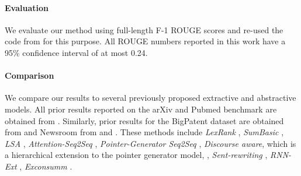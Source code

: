 \documentclass[letterpaper]{article} \usepackage{arXiv_V2_aaai_sty_mods}  \usepackage{times}  \usepackage{helvet} \usepackage{courier}  \usepackage[hyphens]{url}  \usepackage{graphicx} \usepackage[utf8]{inputenc} \usepackage[T1]{fontenc}    \usepackage{url}            \usepackage{booktabs}       \usepackage{amsfonts}       \usepackage{nicefrac}       \usepackage{multirow}
\begin{document}
\paragraph{Evaluation} We evaluate our method using full-length F-1 ROUGE scores \cite{rouge} and re-used the code from \cite{discourse/corr/abs-1804-05685} for this purpose. All ROUGE numbers reported in this work have a 95\% confidence interval of at most 0.24.

\paragraph{Comparison} We compare our results to several previously proposed extractive and abstractive models. All prior results reported on the arXiv and Pubmed benchmark are obtained from \cite{discourse/corr/abs-1804-05685}. Similarly, prior results for the BigPatent dataset are obtained from \cite{sharma2019bigpatent} and Newsroom from \cite{grusky2018newsroom} and \cite{mendes2019jointly}. These methods include \emph{LexRank} \cite{erkan2004lexrank}, \emph{SumBasic} \cite{vanderwende2007beyond}, \emph{LSA} \cite{steinberger2004using}, \emph{Attention-Seq2Seq} \cite{nallapati2016abstractive,chopra2016abstractive}, \emph{Pointer-Generator Seq2Seq} \cite{asee2017pointer},
\emph{Discourse aware}, which is a hierarchical extension to the pointer generator model, \cite{discourse/corr/abs-1804-05685}, \emph{Sent-rewriting} \cite{chen2018fast}, \emph{RNN-Ext} \cite{chen2018fast}, \emph{Exconsumm} \cite{mendes2019jointly}.
\end{document}
